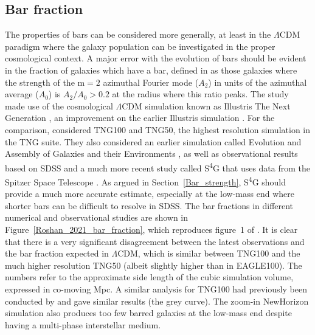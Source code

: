 \documentclass[fleqn,usenatbib,useAMS]{mnras} %
\begin{document}
\subsection{Bar fraction}
\label{Bar_fraction}

The properties of bars can be considered more generally, at least in the $\Lambda$CDM paradigm where the galaxy population can be investigated in the proper cosmological context. A major error with the evolution of bars should be evident in the fraction of galaxies which have a bar, defined in \citet{Roshan_2021_disc_stability} as those galaxies where the strength of the $\mathrm{m} = 2$ azimuthal Fourier mode ($A_2$) in units of the azimuthal average ($A_0$) is $A_2/A_0 > 0.2$ at the radius where this ratio peaks. The study made use of the cosmological $\Lambda$CDM simulation known as Illustris The Next Generation \citep[hereafter TNG;][]{Nelson_2019}, an improvement on the earlier Illustris simulation \citep{Vogelsberger_2014}. For the comparison, \citet{Roshan_2021_disc_stability} considered TNG100 and TNG50, the highest resolution simulation in the TNG suite. They also considered an earlier simulation called Evolution and Assembly of Galaxies and their Environments \citep[EAGLE;][]{Crain_2015, Schaye_2015}, as well as observational results based on SDSS \citep{Oh_2012} and a much more recent study called S\textsuperscript{4}G that uses data from the Spitzer Space Telescope \citep{Erwin_2018}. As argued in Section~\ref{Bar_strength}, S\textsuperscript{4}G should provide a much more accurate estimate, especially at the low-mass end where shorter bars can be difficult to resolve in SDSS. The bar fractions in different numerical and observational studies are shown in Figure~\ref{Roshan_2021_bar_fraction}, which reproduces figure~1 of \citet{Roshan_2021_bar_speed}. It is clear that there is a very significant disagreement between the latest observations and the bar fraction expected in $\Lambda$CDM, which is similar between TNG100 and the much higher resolution TNG50 (albeit slightly higher than in EAGLE100). The numbers refer to the approximate side length of the cubic simulation volume, expressed in co-moving Mpc. A similar analysis for TNG100 had previously been conducted by \citet{Zhao_2020} and gave similar results (the grey curve). The zoom-in NewHorizon simulation \citep{Dubois_2021} also produces too few barred galaxies at the low-mass end \citep{Reddish_2022} despite having a multi-phase interstellar medium.
\end{document}

